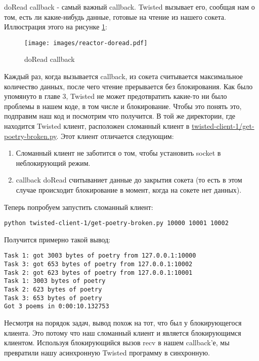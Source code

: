 doRead callback - самый важный callback. Twisted 
вызывает его, сообщая нам  о том, есть ли какие-нибудь данные, 
готовые на чтение из нашего сокета. Иллюстрация этого на 
рисунке \ref{fig:reactor-doread}:

\begin{figure}[h]
\begin{center}
    \texttt{[image: images/reactor-doread.pdf]}
    \caption{doRead callback\label{fig:reactor-doread}}
\end{center}
\end{figure}

Каждый раз, когда вызывается callback, 
из сокета считывается максимальное количество данных, после 
чего чтение прерывается без блокирования. Как было упомянуто в 
главе 3, Twisted не может предотвратить какие-то ни было 
проблемы в нашем коде, в том числе и блокирование. Чтобы это понять 
это, подправим наш код и посмотрим что получится. В той же 
директории, где находится Twisted клиент, расположен сломанный 
клиент в \href{http://github.com/jdavisp3/twisted-intro/blob/master/twisted-client-1/get-poetry-broken.py}{twisted-client-1/get-poetry-broken.py}. Этот клиент отличается следующим:

\begin{enumerate}
\item Сломанный клиент не заботится о том, чтобы установить socket в неблокирующий режим. 
\item callback doRead считываниет данные до закрытия сокета (то есть в этом случае 
происходит блокирование в момент, когда на сокете нет данных).
\end{enumerate}

Теперь попробуем запустить сломанный клиент:

 \begin{verbatim}
python twisted-client-1/get-poetry-broken.py 10000 10001 10002
\end{verbatim} 

Получится примерно такой вывод:

 \begin{verbatim}
Task 1: got 3003 bytes of poetry from 127.0.0.1:10000
Task 3: got 653 bytes of poetry from 127.0.0.1:10002
Task 2: got 623 bytes of poetry from 127.0.0.1:10001
Task 1: 3003 bytes of poetry
Task 2: 623 bytes of poetry
Task 3: 653 bytes of poetry
Got 3 poems in 0:00:10.132753
\end{verbatim} 


Несмотря на порядок задач, вывод похож на тот, что был 
у блокирующегося клиента. Это потому что наш сломанный 
клиент и является блокирующимся клиентом. Используя блокирующийся 
вызов recv в нашем callback'е, мы превратили нашу 
асинхронную Twisted программу в синхронную. 


